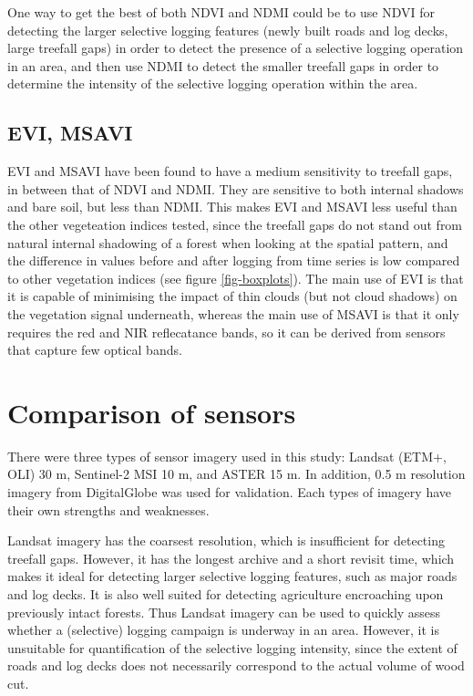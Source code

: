 \documentclass[a4paper,12pt]{scrbook}
\begin{document}
One way to get the best of both \ac{NDVI} and \ac{NDMI} could be to use \ac{NDVI} for detecting the larger selective logging features (newly built roads and log decks, large treefall gaps) in order to detect the presence of a selective logging operation in an area, and then use \ac{NDMI} to detect the smaller treefall gaps in order to determine the intensity of the selective logging operation within the area.

\subsection{EVI, MSAVI}

\ac{EVI} and \ac{MSAVI} have been found to have a medium sensitivity to treefall gaps, in between that of \ac{NDVI} and \ac{NDMI}. They are sensitive to both internal shadows and bare soil, but less than \ac{NDMI}. This makes \ac{EVI} and \ac{MSAVI} less useful than the other vegeteation indices tested, since the treefall gaps do not stand out from natural internal shadowing of a forest when looking at the spatial pattern, and the difference in values before and after logging from time series is low compared to other vegetation indices (see figure \ref{fig-boxplots}). The main use of \ac{EVI} is that it is capable of minimising the impact of thin clouds (but not cloud shadows) on the vegetation signal underneath, whereas the main use of \ac{MSAVI} is that it only requires the red and \ac{NIR} reflecatance bands, so it can be derived from sensors that capture few optical bands.

\section{Comparison of sensors}

There were three types of sensor imagery used in this study: Landsat (\ac{ETM+}, \ac{OLI}) 30 m, Sentinel-2 \ac{MSI} 10 m, and \ac{ASTER} 15 m. In addition, 0.5 m resolution imagery from DigitalGlobe was used for validation. Each types of imagery have their own strengths and weaknesses.

Landsat imagery has the coarsest resolution, which is insufficient for detecting treefall gaps. However, it has the longest archive and a short revisit time, which makes it ideal for detecting larger selective logging features, such as major roads and log decks. It is also well suited for detecting agriculture encroaching upon previously intact forests. Thus Landsat imagery can be used to quickly assess whether a (selective) logging campaign is underway in an area. However, it is unsuitable for quantification of the selective logging intensity, since the extent of roads and log decks does not necessarily correspond to the actual volume of wood cut.
\end{document}

